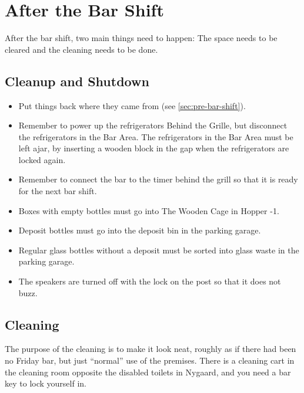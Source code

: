 \section{After the Bar Shift}
\label{sec:post-bar-shift}

After the bar shift, two main things need to happen: 
The space needs to be cleared and the cleaning needs to be done.

\subsection{Cleanup and Shutdown}
\label{sec:post:cleanup}

\begin{itemize}
	\item Put things back where they came from (see
	\autoref{sec:pre-bar-shift}).
	\item Remember to power up the refrigerators Behind the Grille,
	but disconnect the refrigerators in the Bar Area.
	The refrigerators in the Bar Area must be left ajar,
	by inserting a wooden block in the gap when the refrigerators are locked again.
	\item Remember to connect the bar to the timer behind the grill so that it
	is ready for the next bar shift.
	\item Boxes with empty bottles must go into The Wooden Cage in Hopper -1.
	\item Deposit bottles must go into the deposit bin in the parking garage.
	\item Regular glass bottles without a deposit must be sorted into glass waste in the parking garage.
	\item The speakers are turned off with the lock on the post so that it does not buzz.
\end{itemize}

\subsection{Cleaning}
\label{sec:post:cleaning}

The purpose of the cleaning is to make it look neat, roughly as if
there had been no Friday bar, but just ``normal'' use of the
premises. There is a cleaning cart in the
cleaning room opposite the disabled toilets in Nygaard,
and you need a bar key to lock yourself in.

